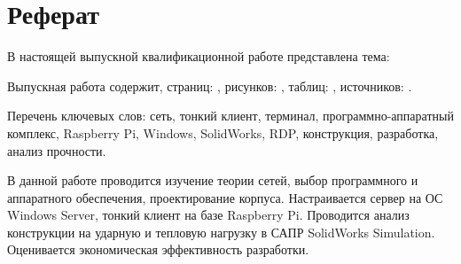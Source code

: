 \chapter*{Реферат}

В настоящей выпускной квалификационной работе представлена тема:

Выпускная работа содержит, страниц: \pageref{LastPage}, рисунков: \totalfigures,
таблиц: \totaltables, источников: .

Перечень ключевых слов: сеть, тонкий клиент, терминал, программно-аппаратный комплекс,
Raspberry Pi, Windows, SolidWorks, RDP, конструкция, разработка, анализ прочности.

В данной работе проводится изучение теории сетей, выбор программного и аппаратного
обеспечения, проектирование корпуса. Настраивается сервер на ОС Windows Server, тонкий
клиент на базе Raspberry Pi. Проводится анализ конструкции на ударную и тепловую
нагрузку в САПР SolidWorks Simulation. Оценивается экономическая эффективность
разработки.
